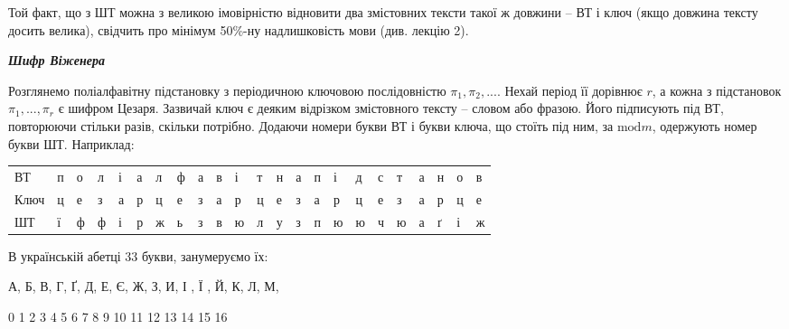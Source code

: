 \documentclass[a4paper]{article}
\newcounter{}
\begin{document}
Той факт, що з ШТ можна з великою імовірністю відновити два змістовних тексти
такої ж довжини – ВТ і ключ (якщо довжина тексту досить велика), свідчить про
мінімум 50\%-ну надлишковість мови (див. лекцію 2).


\bigskip

{\centering\bfseries\itshape
Шифр Віженера
\par}


\bigskip


\bigskip

Розглянемо поліалфавітну підстановку з періодичною ключовою послідовністю  ${\pi
_{{1}},\pi _{{2}},\text{.}\text{.}\text{.}}$. Нехай період її дорівнює  ${r}$,
а кожна з підстановок  ${\pi _{{1}},\text{.}\text{.}\text{.},\pi _{{r}}}$ є
шифром Цезаря. Зазвичай ключ є деяким відрізком змістовного тексту – словом або
фразою. Його підписують під ВТ, повторюючи стільки разів, скільки потрібно.
Додаючи номери букви ВТ і букви ключа, що стоїть під ним, за  ${\text{mod}m}$,
одержують номер букви ШТ. Наприклад:


\bigskip


\bigskip

\begin{flushleft}
\tablehead{}
\begin{supertabular}{m{0.54135984in}m{0.17545986in}m{0.19765985in}m{0.19765985in}m{0.15805984in}m{0.16845983in}m{0.20595986in}m{0.19765985in}m{0.15805984in}m{0.16365984in}m{0.21705985in}m{0.17545986in}m{0.17545986in}m{0.15805984in}m{0.17545986in}m{0.21705985in}m{0.21705985in}m{0.16915983in}m{0.21705985in}m{0.15805984in}m{0.17545986in}m{0.17545986in}m{0.20595986in}}
ВТ  &
п &
о &
л &
і &
а &
л &
ф &
а &
в &
і &
т &
н &
а &
п &
і &
д &
с &
т &
а &
н &
о &
в\\
Ключ &
ц &
е &
з &
а &
р &
ц &
е &
з &
а &
р &
ц &
е &
з &
а &
р &
ц &
е &
з &
а &
р &
ц &
е\\
ШТ &
ї &
ф &
ф &
і &
р &
ж &
ь &
з &
в &
ю &
л &
у &
з &
п &
ю &
ю &
ч &
ю &
а &
ґ &
і &
ж\\
\end{supertabular}
\end{flushleft}

\bigskip

В українській абетці 33 букви, занумеруємо їх: 


\bigskip

{\centering
А,   Б,   В,   Г,  Ґ,  Д,   Е,   Є,   Ж,   З,   И,   І ,    Ї ,   Й,   К,   Л,  
М,
\par}

 0    1    2    3  4  5  6   7    8  9  10   11   12  13   14   15  16  
\end{document}
